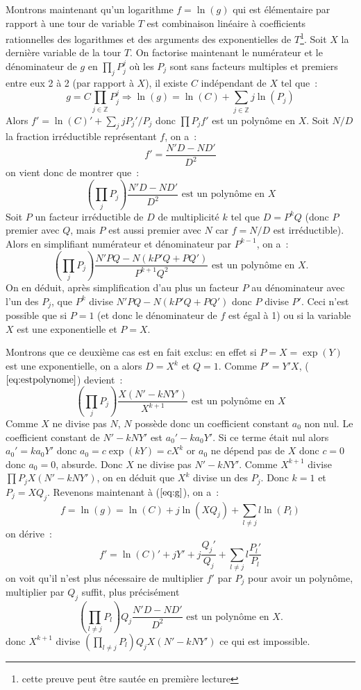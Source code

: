 \documentclass[a4paper,11pt]{book}
\begin{document}
\begin{giacjshere}
Montrons maintenant qu'un logarithme $f=\ln(g)$ qui est élémentaire
par rapport à une tour de variable $T$ est combinaison linéaire à
coefficients rationnelles des logarithmes et des arguments
des exponentielles de $T$\footnote{cette preuve peut être sautée en première
lecture}.
Soit $X$ la dernière variable de la tour $T$.
On factorise maintenant le numérateur et le dénominateur de $g$ en
$\prod_j P_j^j$ où les $P_j$ sont sans facteurs multiples et 
premiers entre eux 2 à 2 (par rapport à $X$), il existe
$C$ indépendant de $X$ tel que~:
\begin{equation} \label{eq:g}
 g=C\prod_{j \in \mathbb{Z}} P_j ^{j} \Rightarrow 
\ln(g)=\ln(C)+\sum_{j \in \mathbb{Z}} j \ln(P_j)
\end{equation}
Alors $f'=\ln(C)'+\sum_j j P_j'/P_j$ donc $\prod P_j f'$ est un 
polynôme en $X$. 
Soit $N/D$ la fraction irréductible représentant $f$, on a~:
\[ f'=\frac{N' D -N D'}{D^2}\]
on vient donc de montrer que~:
\begin{equation} \label{eq:prodpj}
\left(\prod_j P_j \right) \frac{N' D - N D'}{D^2} 
\mbox{ est un polynôme en $X$}
\end{equation}
Soit $P$ un facteur irréductible de $D$ de multiplicité
$k$ tel que $D=P^k Q$ (donc $P$ premier avec $Q$, mais $P$ est aussi
premier avec $N$ car $f=N/D$ est irréductible). Alors en simplifiant
numérateur et dénominateur par $P^{k-1}$, on a~:
\begin{equation} \label{eq:estpolynome}
 \left( \prod_j P_j \right) \frac{N' P Q - N (kP'Q+PQ')}{ P^{k+1} Q^2} 
\mbox{ est un polynôme en $X$.} 
\end{equation}
On en déduit, après simplification d'au plus un facteur $P$ au dénominateur 
avec l'un des $P_j$, que $P^{k}$ divise 
$N' P Q - N (kP'Q+PQ')$ donc $P$ divise $P'$. Ceci n'est possible
que si $P=1$ (et donc le dénominateur de $f$ est égal à 1) 
ou si la variable $X$ est une exponentielle et $P=X$.

Montrons que ce deuxième cas est en fait exclus:
en effet si $P=X=\exp(Y)$ est une exponentielle, on a alors 
$D=X^k$ et $Q=1$.
Comme $P'=Y'X$, (\(\ref{eq:estpolynome}\)) devient~:
\[ \left( \prod_j P_j \right) \frac{X (N' - k N Y' )}{X^{k+1}}
\mbox{ est un polynôme en $X$} \]
Comme $X$ ne divise pas $N$, $N$ possède donc un coefficient constant 
$a_0$ non nul. Le coefficient constant de $N'-kNY'$ est $a_0'-ka_0 Y'$. 
Si ce terme était nul alors $a_0'=ka_0 Y'$ donc $a_0=c \exp(kY)=cX^k$ 
or $a_0$ ne dépend pas de $X$ donc $c=0$ donc $a_0=0$, absurde. 
Donc $X$ ne divise pas $N'-kNY'$.
Comme $X^{k+1}$ divise $ \prod P_j X (N' - k N Y' )$, on en déduit que
$X^k$ divise un des $P_j$. Donc $k=1$ et $P_j=XQ_j$. 
Revenons maintenant à (\(\ref{eq:g}\)), on a~:
\[  f=\ln(g) = \ln(C)+j \ln(XQ_j)+ \sum_{l \neq j} l \ln(P_l) \]
on dérive~:
\[ f'=\ln(C)'+jY'+j\frac{Q_j'}{Q_j}+\sum_{l \neq j} l \frac{P_l'}{P_l}\]
on voit qu'il n'est plus nécessaire de multiplier $f'$ par $P_j$
pour avoir un polynôme, multiplier par $Q_j$ suffit, plus précisément
\[ 
\left( \prod_{l \neq j} P_l \right) Q_j \frac{N' D - N D'}{D^2} 
\mbox{ est un polynôme en $X$.} 
\]
donc $X^{k+1}$ divise  
$ \left(\prod_{l \neq j}P_l \right) Q_j X (N' - k N Y' )$ 
ce qui est impossible.


\end{giacjshere}
\end{document}
